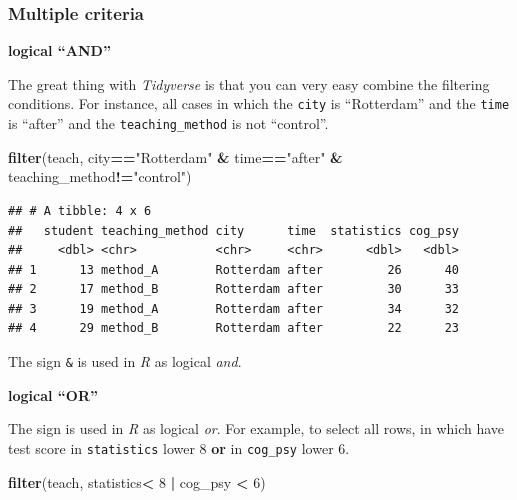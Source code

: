 \documentclass[
]{scrartcl}
\newenvironment{Shaded}{\begin{snugshade}}{\end{snugshade}}
\newcommand{\DecValTok}[1]{\textcolor[rgb]{0.00,0.00,0.81}{#1}}
\newcommand{\FunctionTok}[1]{\textcolor[rgb]{0.13,0.29,0.53}{\textbf{#1}}}
\newcommand{\NormalTok}[1]{#1}
\newcommand{\SpecialCharTok}[1]{\textcolor[rgb]{0.81,0.36,0.00}{\textbf{#1}}}
\newcommand{\StringTok}[1]{\textcolor[rgb]{0.31,0.60,0.02}{#1}}
\begin{document}
\hypertarget{multiple-criteria}{%
\subsubsection{Multiple criteria}\label{multiple-criteria}}

\textbf{logical ``AND''}

The great thing with \emph{Tidyverse} is that you can very easy combine the filtering conditions. For instance, all cases in which the \texttt{city} is ``Rotterdam'' and the \texttt{time} is ``after'' and the \texttt{teaching\_method} is not ``control''.

\begin{Shaded}
\begin{Highlighting}[]
\FunctionTok{filter}\NormalTok{(teach, city}\SpecialCharTok{==}\StringTok{"Rotterdam"} \SpecialCharTok{\&}\NormalTok{ time}\SpecialCharTok{==}\StringTok{"after"} \SpecialCharTok{\&}\NormalTok{ teaching\_method}\SpecialCharTok{!=}\StringTok{"control"}\NormalTok{)}
\end{Highlighting}
\end{Shaded}

\begin{verbatim}
## # A tibble: 4 x 6
##   student teaching_method city      time  statistics cog_psy
##     <dbl> <chr>           <chr>     <chr>      <dbl>   <dbl>
## 1      13 method_A        Rotterdam after         26      40
## 2      17 method_B        Rotterdam after         30      33
## 3      19 method_A        Rotterdam after         34      32
## 4      29 method_B        Rotterdam after         22      23
\end{verbatim}

The sign \texttt{\&} is used in \emph{R} as logical \emph{and}.

\textbf{logical ``OR''}

The sign \texttt{\textbar{}} is used in \emph{R} as logical \emph{or}. For example, to select all rows, in which have test score in \texttt{statistics} lower 8 \textbf{or} in \texttt{cog\_psy} lower 6.

\begin{Shaded}
\begin{Highlighting}[]
\FunctionTok{filter}\NormalTok{(teach, statistics}\SpecialCharTok{\textless{}} \DecValTok{8} \SpecialCharTok{|}\NormalTok{ cog\_psy }\SpecialCharTok{\textless{}} \DecValTok{6}\NormalTok{)}
\end{Highlighting}
\end{Shaded}
\end{document}
